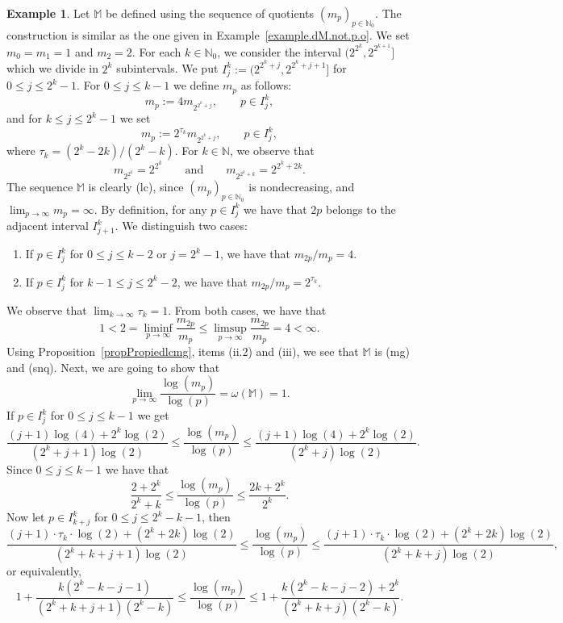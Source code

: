 \documentclass[11pt,a4paper]{article}
\theoremstyle{definition}
\newtheorem{exam}[theo]{Example}
\def\oo{\infty}
\def\ri{\rightarrow}
\def\o{\omega}
\def\N{\mathbb{N}}
\def\M{\mathbb{M}}
\begin{document}
\begin{exam}\label{exampleGdoesnotimplyE}
Let $\M$ be defined using the sequence of  quotients
$(m_p)_{p\in \N_0}$. The construction is similar as the one  given in Example~\ref{example.dM.not.p.o}.
We set $m_0=m_1=1$ and $m_2=2$. For each $k\in\N_0$, we consider the interval $(2^{2^k}, 2^{2^{k+1}}]$ which we divide in $2^k$
 subintervals. We put $I^k_j:=(2^{2^k+j}, 2^{2^k+j+1}]$ for $0\le j\le 2^k-1$.
For $0\le j\le k-1$  we
define $m_p$ as follows:
$$m_p:= 4 m_{2^{2^k+j}}, \qquad p\in I^k_j,$$
and for $k\leq j\leq 2^k-1$ we set
$$m_p:= 2^{\tau_k} m_{2^{2^k+j}}, \qquad p\in I^k_j, $$
where $\tau_k= (2^k-2k)/(2^k-k) $. For $k\in\N$, we observe that
$$m_{2^{2^k}}=2^{2^k}\qquad\text{and} \qquad  m_{2^{{2^k}+ k}}=2^{{2^k}+2k}.$$
The sequence $\M$ is clearly (lc), since $(m_p)_{p\in\N_0}$ is nondecreasing, and $\lim_{p\to\oo}m_p=\oo$. By definition, for any
$p\in I^k_j$ we have that $2p$ belongs to the adjacent interval $I^k_{j+1}$. We distinguish two cases:
\begin{enumerate}
 \item If $p\in I_j^k$ for $0\leq j\leq k-2$ or $j=2^k-1$, we have that $m_{2p}/m_p= 4$.
 \item If $p\in I_j^k$ for $k-1\leq j\leq 2^k-2$,  we have that
 $m_{2p}/m_p=2^{\tau_k}$.
\end{enumerate}
We observe that $\lim_{k\ri\oo} \tau_k=1$.
From both cases, we have that
\begin{equation}\label{equa.Schindl.Exam.liminf.limsup}
 1<2=\liminf_{p\ri\oo}\frac{m_{2p}}{m_p} \leq \limsup_{p\ri\oo}\frac{m_{2p}}{m_p}=4<\oo.
 \end{equation}
Using Proposition~\ref{propPropiedlcmg}, items (ii.2) and (iii), we see that $\M$ is (mg) and (snq). Next, we are
going to show that
$$\lim_{p\to\oo} \frac{\log(m_p)}{\log(p)}=\o(\M)=1.$$
If $p\in I^k_j$ for $0\le j\le k-1$  we get
$$\frac{(j+1)\log(4)+2^k\log(2)}{(2^k+j+1)\log(2)}\le\frac{\log(m_p)}{\log(p)}\le\frac{(j+1)\log(4)+2^k\log(2)}{(2^k+j)\log(2)}.$$
Since $0\le j\le k-1$ we have that
\begin{equation}\label{equa.Schindl.Exam.limlogmp.0.k}
\frac{2+2^k}{2^k+k}\le\frac{\log(m_p)}{\log(p)}\le\frac{2k +2^k }{2^k}.
\end{equation}
Now let $p\in I^k_{k+j}$ for $0\le j\le 2^k -k-1$, then
$$\frac{(j+1)\cdot\tau_k\cdot\log(2)+(2^k+2k)\log(2)}{(2^k+k+j+1)\log(2)}\le \frac{\log(m_p)}{\log(p)}\le \frac{(j+1)\cdot\tau_k\cdot\log(2)+(2^k+2k)\log(2)}{(2^k+k+j)\log(2)},$$
or equivalently,
$$1+\frac{k(2^k-k-j-1)}{(2^k+k+j+1) (2^k-k) }\le\frac{\log(m_p)}{\log(p)}\le1+\frac{k(2^k-k-j-2)+2^k}{(2^k+k+j) (2^k-k) }.$$

\end{exam}
\end{document}
